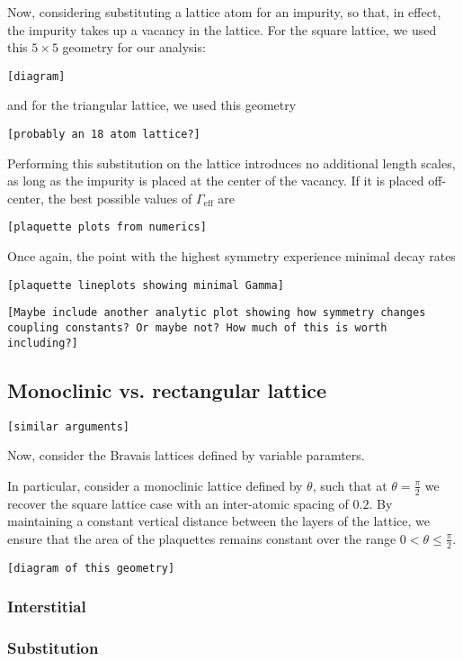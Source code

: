 \documentclass[aps,pra,superscriptaddress,twocolumn]{revtex4-1}
\newcommand{\commentSB}[1]{\texttt{\color{blue}[#1]}}
\newcommand{\commentSO}[1]{\texttt{\color{orange}[#1]}}
\begin{document}
Now, considering substituting a lattice atom for an impurity, so that, in effect, the impurity takes up a vacancy in the lattice. For the square lattice, we used this $5 \times 5$ geometry for our analysis:

\commentSB{diagram}

and for the triangular lattice, we used this geometry

\commentSB{probably an 18 atom lattice?}

Performing this substitution on the lattice introduces no additional length scales, as long as the impurity is placed at the center of the vacancy. If it is placed off-center, the best possible values of $\Gamma_\text{eff}$ are 

\commentSB{plaquette plots from numerics}

Once again, the point with the highest symmetry experience  minimal decay rates

\commentSB{plaquette lineplots showing minimal Gamma}

\commentSB{Maybe include another analytic plot showing how symmetry changes coupling constants? Or maybe not? How much of this is worth including?}

\subsection{Monoclinic vs. rectangular lattice}
\commentSO{similar arguments}

Now, consider the Bravais lattices defined by variable paramters. 

In particular, consider a monoclinic lattice defined by $\theta$, such that at $\theta = \frac{\pi}{2}$ we recover the square lattice case with an inter-atomic spacing of $0.2$. By maintaining a constant vertical distance between the layers of the lattice, we ensure that the area of the plaquettes remains constant over the range $ 0 < \theta \leq \frac{\pi}{2}$. 

\commentSB{diagram of this geometry}

\subsubsection{Interstitial}


\subsubsection{Substitution}
\end{document}
